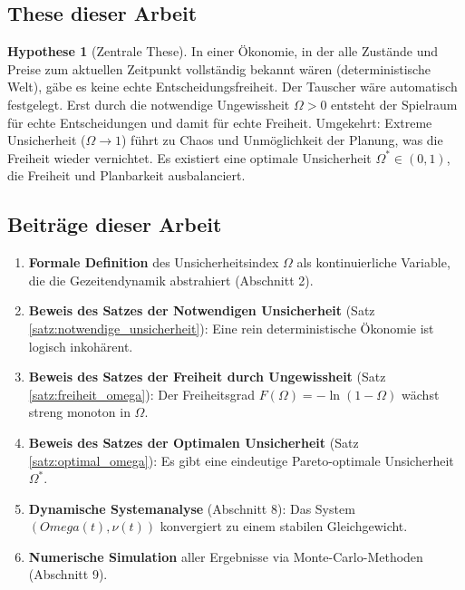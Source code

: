 \documentclass[a4paper, 12pt, twoside, openright]{report}
\theoremstyle{definition}
\theoremstyle{definition}
\newtheorem{hypothese}{Hypothese}[chapter]
\begin{document}
\subsection{These dieser Arbeit}

\begin{hypothese}[Zentrale These]
    In einer Ökonomie, in der alle Zustände und Preise zum aktuellen Zeitpunkt vollständig bekannt wären (deterministische Welt), gäbe es keine echte Entscheidungsfreiheit. Der Tauscher wäre automatisch festgelegt. Erst durch die notwendige Ungewissheit $\Omega > 0$ entsteht der Spielraum für echte Entscheidungen und damit für echte Freiheit. Umgekehrt: Extreme Unsicherheit ($\Omega \to 1$) führt zu Chaos und Unmöglichkeit der Planung, was die Freiheit wieder vernichtet. Es existiert eine optimale Unsicherheit $\Omega^* \in (0,1)$, die Freiheit und Planbarkeit ausbalanciert.
\end{hypothese}

\subsection{Beiträge dieser Arbeit}

\begin{enumerate}
    \item \textbf{Formale Definition} des Unsicherheitsindex $\Omega$ als kontinuierliche Variable, die die Gezeitendynamik abstrahiert (Abschnitt 2).
    
    \item \textbf{Beweis des Satzes der Notwendigen Unsicherheit} (Satz \ref{satz:notwendige_unsicherheit}): Eine rein deterministische Ökonomie ist logisch inkohärent.
    
    \item \textbf{Beweis des Satzes der Freiheit durch Ungewissheit} (Satz \ref{satz:freiheit_omega}): Der Freiheitsgrad $F(\Omega) = -\ln(1-\Omega)$ wächst streng monoton in $\Omega$.
    
    \item \textbf{Beweis des Satzes der Optimalen Unsicherheit} (Satz \ref{satz:optimal_omega}): Es gibt eine eindeutige Pareto-optimale Unsicherheit $\Omega^*$.
    
    \item \textbf{Dynamische Systemanalyse} (Abschnitt 8): Das System $(Omega(t), \nu(t))$ konvergiert zu einem stabilen Gleichgewicht.
    
    \item \textbf{Numerische Simulation} aller Ergebnisse via Monte-Carlo-Methoden (Abschnitt 9).
\end{enumerate}
\end{document}
